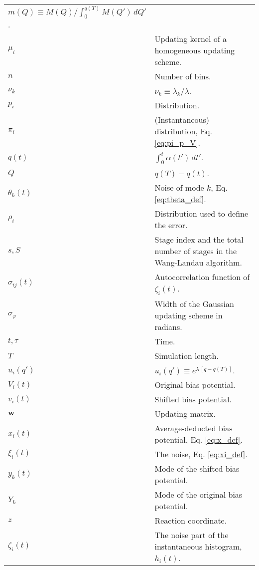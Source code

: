 \documentclass[reprint, superscriptaddress, floatfix]{revtex4-1}
\begin{document}
{\begin{table*}
\begin{tabular}{l | p{12cm} }
                        $m(Q) \equiv M(Q)/\int_0^{ q(T) } M(Q') \, dQ'$.  \\
    $\mu_i$         &   Updating kernel of a homogeneous updating scheme. \\
    $n$             &   Number of bins. \\
    $\nu_k$         &   $\nu_k \equiv \lambda_k / \lambda$. \\
    $p_i$           &   Distribution. \\
    $\pi_i$         &   (Instantaneous) distribution, Eq. \eqref{eq:pi_p_V}. \\
    $q(t)$          &   $\int_0^t \alpha(t') \, dt'$.  \\
    $Q$             &   $q(T) - q(t)$.  \\
    $\theta_k(t)$   &   Noise of mode $k$, Eq. \eqref{eq:theta_def}. \\
    $\rho_i$        &   Distribution used to define the error. \\
    $s, S$          &   Stage index and the total number of stages in the Wang-Landau algorithm. \\
    $\sigma_{ij}(t)$   &   Autocorrelation function of $\zeta_i(t)$. \\
    $\sigma_\varphi$   &   Width of the Gaussian updating scheme in radians. \\
    $t, \tau$       &   Time. \\
    $T$             &   Simulation length. \\
    $u_i(q')$       &   $u_i(q') \equiv e^{\lambda \, [q - q(T)]}$. \\
    $V_i(t)$        &   Original bias potential. \\
    $v_i(t)$        &   Shifted bias potential. \\
    $\mathbf w$     &   Updating matrix. \\
    $x_i(t)$        &   Average-deducted bias potential, Eq. \eqref{eq:x_def}. \\
    $\xi_i(t)$      &   The noise, Eq. \eqref{eq:xi_def}. \\
    $y_k(t)$        &   Mode of the shifted bias potential. \\
    $Y_k$           &   Mode of the original bias potential. \\
    $z$             &   Reaction coordinate. \\
    $\zeta_i(t)$    &   The noise part of the instantaneous histogram, $h_i(t)$.
  \end{tabular}
  \end{table*}
}


\end{document}
